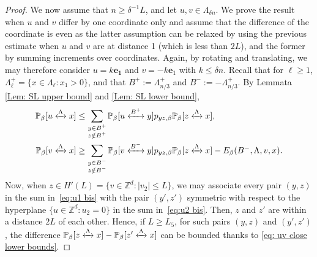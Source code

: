 \documentclass[11pt,a4paper]{article}
\numberwithin{equation}{section}
\theoremstyle{plain}
\theoremstyle{definition}
\newcommand{\connect}{\xleftrightarrow}
\begin{document}
\begin{proof}
 We now assume that $n\geq \delta^{-1}L$, and let $u,v\in \Lambda_{\delta n}$. We prove the result when $u$ and $v$ differ by one coordinate only and assume that the difference of the coordinate is even as the latter assumption can be relaxed by using the previous estimate when $u$ and $v$ are at distance 1 (which is less than $2L$), and the former by summing increments over coordinates. Again, by rotating and translating, we may therefore consider $u=k\mathbf{e_1}$ and $v=-k\mathbf{e}_1$ with $k\leq \delta n$. Recall that for $\ell\geq 1$, $\Lambda_\ell^+=\{x\in \Lambda_\ell : x_1>0\}$, and that $B^+:=\Lambda_{n/3}^+$ and $B^-:=-\Lambda_{n/3}^+$. By Lemmata \ref{Lem: SL upper bound} and \ref{Lem: SL lower bound},
\begin{align}
\mathbb P_\beta[u\connect{\Lambda\:}x] &\le \sum_{\substack{y \in B^+\\ z\notin B^+}}\mathbb P_\beta[u\connect{B^+\:}y]p_{yz,\beta}  \mathbb P_\beta[z\connect{\Lambda\:}x]\label{eq:u1 bis},\\
\mathbb P_\beta[v\connect{\Lambda\:}x]&\ge \sum_{\substack{y \in B^-\\ z\notin B^-}}\mathbb P_\beta[v\connect{B^-\:}y]p_{yz,\beta} \mathbb P_\beta[z\connect{\Lambda\:}x] -E_\beta(B^-,\Lambda,v,x).\label{eq:u2 bis}
\end{align}
Now, when $z\in H'(L)=\{v\in \mathbb Z^d: |v_2|\leq L\}$, we may associate every pair $(y,z)$ in the sum in~\eqref{eq:u1 bis} with the pair $(y',z')$ symmetric with respect to the hyperplane $\{u\in \mathbb Z^d:u_2=0\}$ in the sum in~\eqref{eq:u2 bis}. Then, $z$ and $z'$ are within a distance $2L$ of each other. Hence, if $L\geq L_5$, for such pairs $(y,z)$ and $(y',z')$, the difference $\mathbb P_\beta[z\connect{\Lambda\:}x]-\mathbb P_\beta[z'\connect{\Lambda\:}x]$ can be bounded thanks to \eqref{eq: uv close lower bounds}.


\end{proof}
\end{document}
